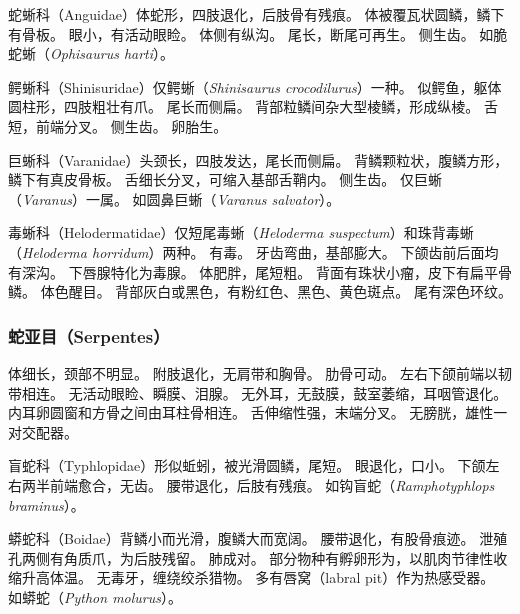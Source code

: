 \documentclass[11pt]{article}
\begin{document}
\newline

蛇蜥科（Anguidae）体蛇形，四肢退化，后肢骨有残痕。
体被覆瓦状圆鳞，鳞下有骨板。
眼小，有活动眼睑。
体侧有纵沟。
尾长，断尾可再生。
侧生齿。
如脆蛇蜥（\textit{Ophisaurus harti}）。

\newline

鳄蜥科（Shinisuridae）仅鳄蜥（\textit{Shinisaurus crocodilurus}）一种。
似鳄鱼，躯体圆柱形，四肢粗壮有爪。
尾长而侧扁。
背部粒鳞间杂大型棱鳞，形成纵棱。
舌短，前端分叉。
侧生齿。
卵胎生。

\newline

巨蜥科（Varanidae）头颈长，四肢发达，尾长而侧扁。
背鳞颗粒状，腹鳞方形，鳞下有真皮骨板。
舌细长分叉，可缩入基部舌鞘内。
侧生齿。
仅巨蜥（\textit{Varanus}）一属。
如圆鼻巨蜥（\textit{Varanus salvator}）。

\newline

毒蜥科（Helodermatidae）仅短尾毒蜥（\textit{Heloderma suspectum}）和珠背毒蜥（\textit{Heloderma horridum}）两种。
有毒。
牙齿弯曲，基部膨大。
下颌齿前后面均有深沟。
下唇腺特化为毒腺。
体肥胖，尾短粗。
背面有珠状小瘤，皮下有扁平骨鳞。
体色醒目。
背部灰白或黑色，有粉红色、黑色、黄色斑点。
尾有深色环纹。

\subsubsection{蛇亚目（Serpentes）}
体细长，颈部不明显。
附肢退化，无肩带和胸骨。
肋骨可动。
左右下颌前端以韧带相连。
无活动眼睑、瞬膜、泪腺。
无外耳，无鼓膜，鼓室萎缩，耳咽管退化。
内耳卵圆窗和方骨之间由耳柱骨相连。
舌伸缩性强，末端分叉。
无膀胱，雄性一对交配器。

\newline

盲蛇科（Typhlopidae）形似蚯蚓，被光滑圆鳞，尾短。
眼退化，口小。
下颌左右两半前端愈合，无齿。
腰带退化，后肢有残痕。
如钩盲蛇（\textit{Ramphotyphlops braminus}）。

\newline

蟒蛇科（Boidae）背鳞小而光滑，腹鳞大而宽阔。
腰带退化，有股骨痕迹。
泄殖孔两侧有角质爪，为后肢残留。
肺成对。
部分物种有孵卵形为，以肌肉节律性收缩升高体温。
无毒牙，缠绕绞杀猎物。
多有唇窝（labral pit）作为热感受器。
如蟒蛇（\textit{Python molurus}）。

\newline
\end{document}
